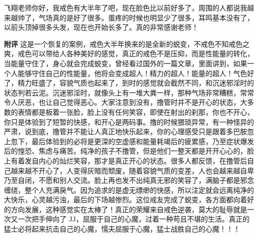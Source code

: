 \begin{case}
    飞翔老师你好，我戒色有大半年了吧，现在脸色比以前好多了，周围的人都说我越来越帅了，气场真的是好了很多。蛋疼的时候也明显少了很多，耳鸣基本没有了，以前头顶掉很多头发，现在也开始长多了。真的非常感谢老师！

    \textbf{附评} 这是一个恢复的案例，戒色大半年换来的是全新的蜕变，不戒色不知戒色之爽，戒色可以带给人各种美好的感觉，真正的戒色不是压抑，而是性能量的转化，当能量守住了，身心就会完成蜕变，曾经看过国外的一篇文章，里面讲到，如果一个人能够守住自己的性能量，他将会变成超人！精力的超人！能量的超人！气色好了，精力旺盛了，容貌气质也起来了，到时的感觉就会截然不同，和沉迷邪淫时的状态判若云泥。沉迷邪淫时，就像头上有一堆大粪一样，那种气场非常糟糕，常常令人厌恶，也让自己觉得恶心。大家注意到没有，撸管时并不是开心的状态，大多数的表情都是板着一张脸，脸上没有任何笑容，即使在射出的刹那，你也不开心，你只是体验到了短暂的快感，和开心是两码事。撸的时候猥琐异常，有一种怪异的严肃，说到底，撸管并不能让人真正地快乐起来，你的心理感受只是跟着多巴胺忽上忽下，最后体验到的必将是更深的空虚感和能量耗竭后的疲累感，乃至症状爆发后的惶恐、焦虑与痛苦。纯净的孩子不撸管，但是他们一整天都是开开心心的，脸上有着发自内心的灿烂笑容，那才是真正开心的状态。很多人都反馈，在撸管后自己越来越不开心了，人变得灰暗而颓废，随着容貌气质的变差，人也会越来越自卑乃至自闭，不愿和别人交流。脸上再也发不出纯真无邪的笑容了，满脑子都是邪念缠绕，整个人充满戾气。因为追求的是虚无缥缈的快感，所以注定就会远离纯净的大快乐，心灵越污浊，最后的下场越惨烈。这位戒友完成了蜕变，各方面都向着好的方向发展，这种感觉实在太棒了！真正的荣耀来自戒色逆袭，莫大的耻辱就是一次又一次把手伸向了 JJ，屈服于自己的心魔，过着一种苟且不堪的生活。真正的猛士必将起来抗击自己的心魔，懦夫屈服于心魔，猛士战胜自己的心魔！！！
\end{case}

